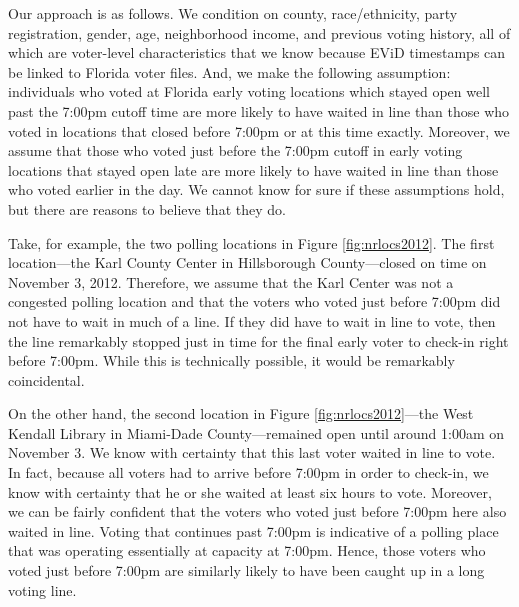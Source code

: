 \documentclass[12pt,titlepage]{article}
\begin{document}



Our approach is as follows. We condition on county, race/ethnicity,
party registration, gender, age, neighborhood income, and previous
voting history, all of which are voter-level characteristics that we
know because EViD timestamps can be linked to Florida voter files.
And, we make the following assumption: individuals who voted at
Florida early voting locations which stayed open well past the 7:00pm
cutoff time are more likely to have waited in line than those who
voted in locations that closed before 7:00pm or at this time
exactly. Moreover, we assume that those who voted just before the
7:00pm cutoff in early voting locations that stayed open late are more
likely to have waited in line than those who voted earlier in the day.
We cannot know for sure if these assumptions hold, but there are
reasons to believe that they do.

Take, for example, the two polling locations in Figure
\ref{fig:nrlocs2012}.  The first location---the Karl County Center in
Hillsborough County---closed on time on November 3, 2012.  Therefore,
we assume that the Karl Center was not a congested polling location
and that the voters who voted just before 7:00pm did not have to wait
in much of a line.  If they did have to wait in line to vote, then the
line remarkably stopped just in time for the final early voter to
check-in right before 7:00pm.  While this is technically possible, it
would be remarkably coincidental.

On the other hand, the second location in Figure
\ref{fig:nrlocs2012}---the West Kendall Library in Miami-Dade
County---remained open until around 1:00am on November 3.  We know
with certainty that this last voter waited in line to vote.  In fact,
because all voters had to arrive before 7:00pm in order to check-in,
we know with certainty that he or she waited at least six hours to
vote.  Moreover, we can be fairly confident that the voters who voted
just before 7:00pm here also waited in line.  Voting that continues
past 7:00pm is indicative of a polling place that was operating
essentially at capacity at 7:00pm.  Hence, those voters who voted just
before 7:00pm are similarly likely to have been caught up in a long
voting line.
\end{document}
